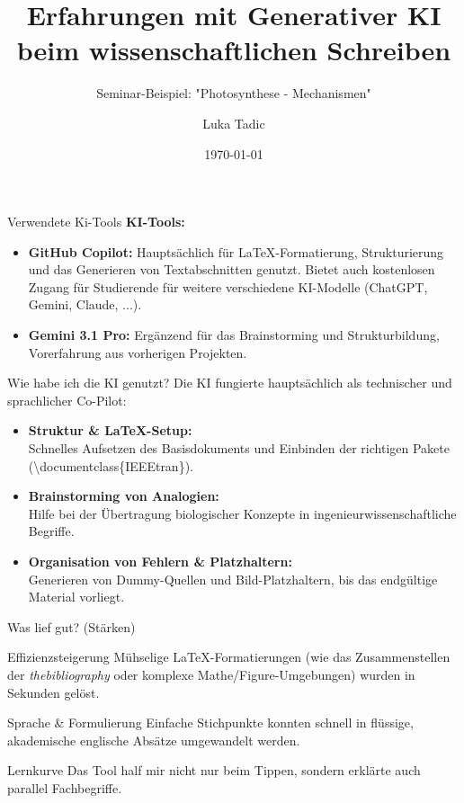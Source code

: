\documentclass[11pt]{beamer}
\title[Generative KI im Paper]{Erfahrungen mit Generativer KI beim wissenschaftlichen Schreiben}
\subtitle{Seminar-Beispiel: "Photosynthese - Mechanismen"}
\author[L. Tadic]{Luka Tadic}
\institute[THU]{Technische Hochschule Ulm (THU) \\ Electrical Energy Systems and Electromobility (M.Eng.)}
\date{\today}
\begin{document}
\begin{frame}
    \titlepage
\end{frame}

\begin{frame}{Verwendete Ki-Tools}
    \textbf{KI-Tools:}
    \begin{itemize}
            \item \textbf{GitHub Copilot:} Hauptsächlich für LaTeX-Formatierung, Strukturierung und das Generieren von Textabschnitten genutzt. Bietet auch kostenlosen Zugang für Studierende für weitere verschiedene KI-Modelle (ChatGPT, Gemini, Claude, ...).
            \item \textbf{Gemini 3.1 Pro:} Ergänzend für das Brainstorming und Strukturbildung, Vorerfahrung aus vorherigen Projekten.
    \end{itemize}
    \vspace{0.5cm}
\end{frame}

\begin{frame}{Wie habe ich die KI genutzt?}
    Die KI fungierte hauptsächlich als technischer und sprachlicher Co-Pilot:
    \vspace{0.3cm}
    \begin{itemize}
        \item \textbf{Struktur \& LaTeX-Setup:} \\
              Schnelles Aufsetzen des Basisdokuments und Einbinden der richtigen Pakete (\textbackslash documentclass\{IEEEtran\}).
        \item \textbf{Brainstorming von Analogien:} \\
              Hilfe bei der Übertragung biologischer Konzepte in ingenieurwissenschaftliche Begriffe.
        \item \textbf{Organisation von Fehlern \& Platzhaltern:} \\
              Generieren von Dummy-Quellen und Bild-Platzhaltern, bis das endgültige Material vorliegt.
    \end{itemize}
\end{frame}

\begin{frame}{Was lief gut? (Stärken)}
    \begin{block}{Effizienzsteigerung}
        Mühselige LaTeX-Formatierungen (wie das Zusammenstellen der \textit{thebibliography} oder komplexe Mathe/Figure-Umgebungen) wurden in Sekunden gelöst.
    \end{block}
    
    \begin{block}{Sprache \& Formulierung}
        Einfache Stichpunkte konnten schnell in flüssige, akademische englische Absätze umgewandelt werden.
    \end{block}
    
    \begin{block}{Lernkurve}
        Das Tool half mir nicht nur beim Tippen, sondern erklärte auch parallel Fachbegriffe.
    \end{block}
\end{frame}
\end{document}
